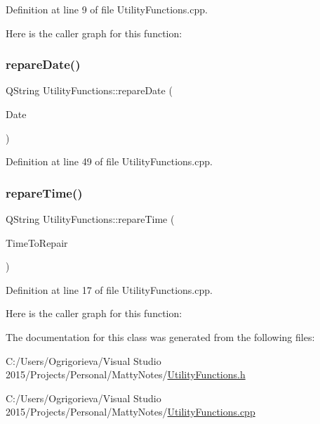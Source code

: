 Definition at line 9 of file Utility\+Functions.\+cpp.

Here is the caller graph for this function\+:
\hypertarget{classUtilityFunctions_a11f16049e57928c6a74aba7438f66841}{}\label{classUtilityFunctions_a11f16049e57928c6a74aba7438f66841} 
\subsubsection{\texorpdfstring{repare\+Date()}{repareDate()}}
{\footnotesize\ttfamily Q\+String Utility\+Functions\+::repare\+Date (\begin{DoxyParamCaption}\item[{Q\+String}]{Date }\end{DoxyParamCaption})\hspace{0.3cm}{\ttfamily [static]}}



Definition at line 49 of file Utility\+Functions.\+cpp.

\hypertarget{classUtilityFunctions_ac2212f463b34781025e9e0bcfeaad3eb}{}\label{classUtilityFunctions_ac2212f463b34781025e9e0bcfeaad3eb} 
\subsubsection{\texorpdfstring{repare\+Time()}{repareTime()}}
{\footnotesize\ttfamily Q\+String Utility\+Functions\+::repare\+Time (\begin{DoxyParamCaption}\item[{Q\+String}]{Time\+To\+Repair }\end{DoxyParamCaption})\hspace{0.3cm}{\ttfamily [static]}}



Definition at line 17 of file Utility\+Functions.\+cpp.

Here is the caller graph for this function\+:


The documentation for this class was generated from the following files\+:\begin{DoxyCompactItemize}
\item 
C\+:/\+Users/\+Ogrigorieva/\+Visual Studio 2015/\+Projects/\+Personal/\+Matty\+Notes/\hyperlink{UtilityFunctions_8h}{Utility\+Functions.\+h}\item 
C\+:/\+Users/\+Ogrigorieva/\+Visual Studio 2015/\+Projects/\+Personal/\+Matty\+Notes/\hyperlink{UtilityFunctions_8cpp}{Utility\+Functions.\+cpp}\end{DoxyCompactItemize}
